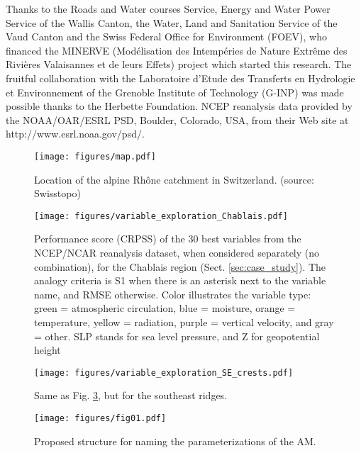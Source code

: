 \documentclass[review]{elsarticle}
\begin{document}
Thanks to the Roads and Water courses Service, Energy and Water Power Service of the Wallis Canton, the Water, Land and Sanitation Service of the Vaud Canton and the Swiss Federal Office for Environment (FOEV), who financed the MINERVE (Mod\'{e}lisation des Intemp\'{e}ries de Nature Extr\^{e}me des Rivi\`{e}res Valaisannes et de leurs Effets) project which started this research. The fruitful collaboration with the Laboratoire d'Etude des Transferts en Hydrologie et Environnement of the Grenoble Institute of Technology (G-INP) was made possible thanks to the Herbette Foundation. NCEP reanalysis data provided by the NOAA/OAR/ESRL PSD, Boulder, Colorado, USA, from their Web site at http://www.esrl.noaa.gov/psd/. 





\clearpage

\begin{figure}[t]
	\texttt{[image: figures/map.pdf]}
	\caption{Location of the alpine Rh\^{o}ne catchment in Switzerland. (source: Swisstopo)}
	\label{figure:map}
\end{figure}

\begin{figure}[t]
	\texttt{[image: figures/variable\_exploration\_Chablais.pdf]}
	\caption{Performance score (CRPSS) of the 30 best variables from the NCEP/NCAR reanalysis dataset, when considered separately (no combination), for the Chablais region (Sect. \ref{sec:case_study}). The analogy criteria is S1 when there is an asterisk next to the variable name, and RMSE otherwise. Color illustrates the variable type: green = atmospheric circulation, blue = moisture, orange = temperature, yellow = radiation, purple = vertical velocity, and gray = other. SLP stands for sea level pressure, and Z for geopotential height}
	\label{figure:variable_exploration_Chablais}
\end{figure}

\begin{figure}[t]
	\texttt{[image: figures/variable\_exploration\_SE\_crests.pdf]}
	\caption{Same as Fig. \ref{figure:variable_exploration_SE_crests}, but for the southeast ridges.}
	\label{figure:variable_exploration_SE_crests}
\end{figure}

\begin{figure}[t]
	\texttt{[image: figures/fig01.pdf]}
	\caption{Proposed structure for naming the parameterizations of the AM.}
	\label{figure:nomenclature}
\end{figure}
\end{document}
